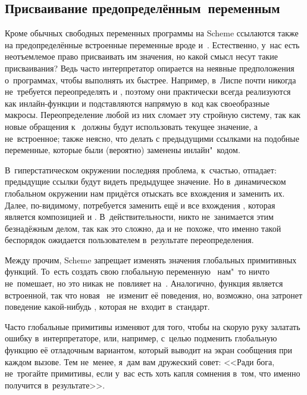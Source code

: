 \subsection{Присваивание предопределённым~переменным}%
\label{assignment/assignment/ssect:predefined}

Кроме обычных свободных переменных программы на Scheme ссылаются также на
предопределённые встроенные переменные вроде  и~. Естественно,
у~нас есть неотъемлемое право присваивать им значения, но какой смысл несут
такие присваивания? Ведь часто интерпретатор опирается на неявные предположения
о~программах, чтобы выполнять их быстрее. Например, в~Лиспе почти никогда
не~требуется переопределять  и , поэтому они практически всегда
реализуются как инлайн-функции и подставляются напрямую в~код как своеобразные
макросы. Переопределение любой из них сломает эту стройную систему, так как
новые обращения к~ должны будут использовать текущее значение, а
не~встроенное; также неясно, что делать с предыдущими ссылками на подобные
переменные, которые были (вероятно) заменены инлайн"~кодом.

В~гиперстатическом окружении последняя проблема, к~счастью, отпадает: предыдущие
ссылки будут видеть предыдущее значение. Но в~динамическом глобальном окружении
нам придётся отыскать все вхождения  и заменить их. Далее, по-видимому,
потребуется заменить ещё и все вхождения , которая является композицией
 и . В~действительности, никто не~занимается этим безнадёжным
делом, так как это сложно, да и не~похоже, что именно такой беспорядок ожидается
пользователем в~результате переопределения.

Между прочим, Scheme запрещает изменять значения глобальных примитивных функций.
То~есть создать свою глобальную переменную~ нам"~то ничто не~помешает,
но это никак не~повлияет на~. Аналогично, функция  является
встроенной, так что новая~ не~изменит её поведения, но, возможно, она
затронет поведение какой-нибудь , которая не~входит в~стандарт.

Часто глобальные примитивы изменяют для того, чтобы на скорую руку залатать
ошибку в~интерпретаторе, или, например, с~целью подменить глобальную функцию её
отладочным вариантом, который выводит на экран сообщения при каждом вызове. Тем
не~менее, я~дам вам дружеский совет: <<Ради бога, не~трогайте примитивы, если
у~вас есть хоть капля сомнения в~том, что именно получится в~результате>>.


